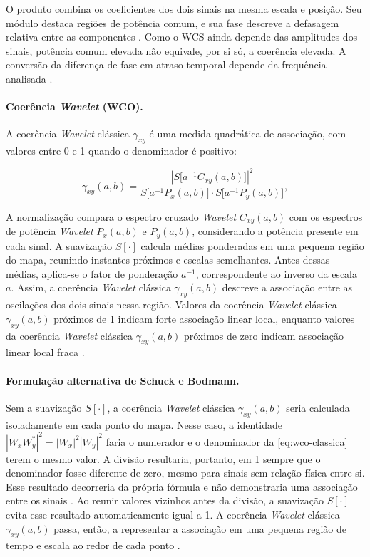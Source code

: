 O produto combina os coeficientes dos dois sinais na mesma escala e posição.
Seu módulo destaca regiões de potência comum, e sua fase descreve a defasagem
relativa entre as componentes \cite{torrence1998,grinsted2004}.
Como o WCS ainda depende das amplitudes dos sinais, potência comum elevada
não equivale, por si só, a coerência elevada. A conversão da diferença de
fase em atraso temporal depende da frequência analisada \cite{grinsted2004}.

\paragraph{Coerência \textit{Wavelet} (WCO).}
A coerência \textit{Wavelet} clássica $\gamma_{xy}$ é uma medida quadrática de associação,
com valores entre 0 e 1 quando o denominador é positivo:

\begin{equation}\label{eq:wco-classica}
  \gamma_{xy}(a, b) = \frac{|S\bigl[a^{-1}C_{xy}(a, b)\bigr]|^2}
                           {S\bigl[a^{-1}P_x(a, b)\bigr] \cdot S\bigl[a^{-1}P_y(a, b)\bigr]},
\end{equation}

\noindent
A normalização compara o espectro cruzado \textit{Wavelet} $C_{xy}(a,b)$ com os
espectros de potência \textit{Wavelet} $P_x(a,b)$ e $P_y(a,b)$, considerando a potência
presente em cada sinal. A suavização $S[\cdot]$ calcula médias ponderadas em uma
pequena região do mapa, reunindo instantes próximos e escalas semelhantes.
Antes dessas médias, aplica-se o fator de ponderação $a^{-1}$, correspondente ao
inverso da escala $a$. Assim, a coerência \textit{Wavelet} clássica $\gamma_{xy}(a,b)$
descreve a associação entre as oscilações dos dois sinais nessa região.
Valores da coerência \textit{Wavelet} clássica $\gamma_{xy}(a,b)$ próximos de 1 indicam
forte associação linear local, enquanto valores da coerência \textit{Wavelet}
clássica $\gamma_{xy}(a,b)$ próximos de zero indicam associação linear local fraca
\cite{grinsted2004}.

\paragraph{Formulação alternativa de Schuck e Bodmann.}

Sem a suavização $S[\cdot]$, a coerência \textit{Wavelet} clássica $\gamma_{xy}(a,b)$
seria calculada isoladamente em cada ponto do mapa. Nesse caso, a identidade
$|W_xW_y^*|^2=|W_x|^2|W_y|^2$ faria o numerador e o denominador da
\autoref{eq:wco-classica} terem o mesmo valor. A divisão resultaria, portanto, em 1
sempre que o denominador fosse diferente de zero, mesmo para sinais sem relação
física entre si. Esse resultado decorreria da própria fórmula e não demonstraria
uma associação entre os sinais \cite{torrence1998}. Ao reunir valores vizinhos antes
da divisão, a suavização $S[\cdot]$ evita esse resultado automaticamente igual a 1.
A coerência \textit{Wavelet} clássica $\gamma_{xy}(a,b)$ passa, então, a representar a
associação em uma pequena região de tempo e escala ao redor de cada ponto
\cite{grinsted2004}.

